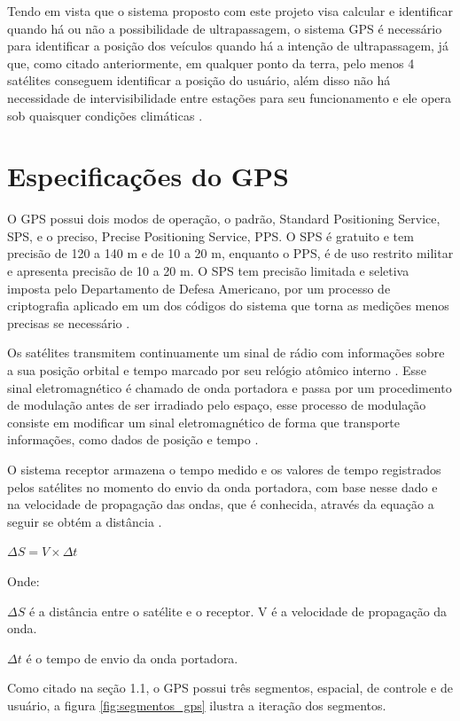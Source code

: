 Tendo em vista que o sistema proposto com este projeto visa calcular e
identificar quando há ou não a possibilidade de ultrapassagem, o sistema
GPS é necessário para identificar a posição dos veículos quando há a
intenção de ultrapassagem, já que, como citado anteriormente, em qualquer
ponto da terra, pelo menos 4 satélites conseguem identificar a posição do
usuário, além disso não há necessidade de intervisibilidade entre estações
para seu funcionamento e ele opera sob quaisquer condições climáticas \cite{sobre_gps}.

\section{Especificações do GPS}

O GPS possui dois modos de operação, o padrão, Standard Positioning Service,
SPS, e o preciso, Precise Positioning Service, PPS. O SPS é gratuito e tem
precisão de 120 a 140 m e de 10 a 20 m, enquanto o PPS, é de uso restrito
militar e apresenta precisão de 10 a 20 m. O SPS tem precisão limitada e
seletiva imposta pelo Departamento de Defesa Americano, por um processo de
criptografia aplicado em um dos códigos do sistema que torna as medições
menos precisas se necessário \cite{6gps}.

Os satélites transmitem continuamente um sinal de rádio com informações sobre
a sua posição orbital e tempo marcado por seu relógio atômico interno \cite{7gps}.
 Esse sinal eletromagnético é chamado de onda portadora e passa por um
 procedimento de modulação antes de ser irradiado pelo espaço, esse processo
 de modulação consiste em modificar um sinal eletromagnético de forma que
 transporte informações, como dados de posição e tempo \cite{8gps}.

O sistema receptor armazena o tempo medido e os valores de tempo registrados
pelos satélites no momento do envio da onda portadora, com base nesse dado e
 na velocidade de propagação das ondas, que é conhecida, através da equação
 a seguir se obtém a distância \cite{8gps}.

 $ \Delta S = V \times  \Delta t $

 Onde:

 $ \Delta S $ é a distância entre o satélite e o receptor.
V é a velocidade de propagação da onda.

$ \Delta t $ é o tempo de envio da onda portadora.

Como citado na seção 1.1, o GPS possui três segmentos, espacial, de controle e
de usuário, a figura \ref{fig:segmentos_gps} ilustra a iteração dos segmentos.


